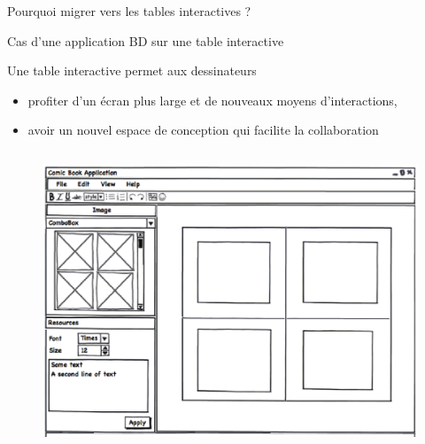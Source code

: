\documentclass[11pt]{beamer}
\begin{document}
\begin{frame}{}
\begin{block}{Pourquoi migrer vers les tables interactives ?}
\end{block}

\end{frame}

\begin{frame}{Cas d'une application BD sur une table interactive }
\begin{block}{\small 	Une table interactive permet aux dessinateurs }
	\begin{itemize}
		\item {\small profiter d'un écran plus large et de nouveaux moyens d'interactions,} 
		\item {\small avoir un nouvel espace de conception qui facilite la collaboration}
	\end{itemize}
\end{block}
 \begin{columns}
 	\begin{figure}[ht]
 	\begin{center}
 	\includegraphics[scale=0.3]{../chap1/img-1}

\end{center}
\end{figure}
\end{columns}
\end{frame}
\end{document}
